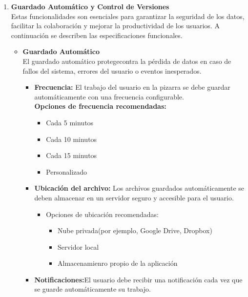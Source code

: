 \documentclass[a4paper, oneside, final]{scrartcl}
\begin{document}
\begin{enumerate}
\item \textbf{Guardado Automático y Control de Versiones}\\ %
  Estas funcionalidades son esenciales para garantizar la seguridad de los datos, facilitar la colaboración y mejorar la productividad de los usuarios. A continuación se describen las especificaciones funcionales.
  \begin{itemize}
  \item  \textbf{Guardado Automático}\\
    El guardado automático protegecontra la pérdida de datos en caso de fallos del sistema, errores del usuario o eventos inesperados.
    \begin{itemize}
    \item \textbf{Frecuencia:} El trabajo del usuario en la pizarra se debe guardar automáticamente con una frecuencia configurable.\\
      \textbf{Opciones de frecuencia recomendadas:}
      \begin{itemize}
      \item Cada 5 minutos
      \item Cada 10 minutos
      \item Cada 15 minutos
      \item Personalizado
      \end{itemize}
    \item \textbf{Ubicación del archivo:} Los archivos guardados automáticamente se deben almacenar en un servidor seguro y accesible para el usuario.
      \begin{itemize}
      \item Opciones de ubicación recomendadas:
        \begin{itemize}
        \item Nube privada(por ejemplo, Google Drive, Dropbox)
        \item Servidor local
        \item Almacenamienro propio de la aplicación
        \end{itemize}
      \end{itemize}
    \item\textbf{Notificaciones:}El usuario debe recibir una notificación cada vez que se guarde automáticamente su trabajo.
      \begin{itemize}

\end{itemize}
\end{itemize}
\end{itemize}
\end{enumerate}
\end{document}
